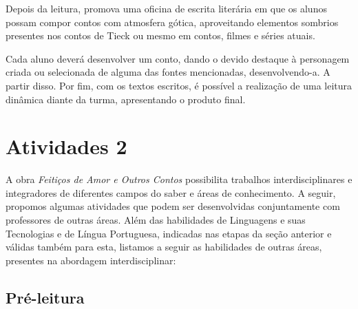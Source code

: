 \documentclass[11pt]{extarticle}
\begin{document}
Depois da leitura, promova uma oficina de escrita literária
em que os alunos possam compor contos com atmosfera gótica, aproveitando
elementos sombrios presentes nos contos de Tieck ou mesmo em contos,
filmes e séries atuais.

Cada aluno deverá desenvolver um conto, dando o devido destaque à
personagem criada ou selecionada de alguma das fontes mencionadas,
desenvolvendo-a. A partir disso. Por fim, com os textos escritos, é
possível a realização de uma leitura dinâmica diante da turma,
apresentando o produto final.


\section{Atividades 2}




A obra \emph{Feitiços de Amor e Outros Contos} possibilita trabalhos
interdisciplinares e integradores de diferentes campos do saber e áreas
de conhecimento. A seguir, propomos algumas atividades que podem ser
desenvolvidas conjuntamente com professores de outras áreas. Além das
habilidades de Linguagens e suas Tecnologias e de Língua Portuguesa,
indicadas nas etapas da seção anterior e válidas também para esta,
listamos a seguir as habilidades de outras áreas, presentes na abordagem
interdisciplinar:

\subsection{Pré-leitura}

\end{document}
